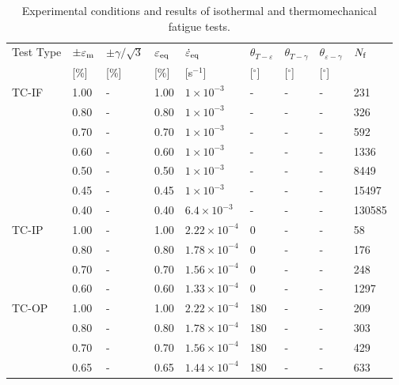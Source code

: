 \begin{table*}[htbp]
  \centering
  \caption{Experimental conditions and results of isothermal and thermomechanical fatigue tests.} \vspace{0.1cm}
    \begin{tabular}{p{2cm}p{1.2cm}p{1.2cm}p{1.2cm}p{2.5cm}p{1cm}p{1cm}p{1cm}p{1cm}}
    \hline
    Test Type & $\pm \varepsilon _{\rm m}$ & $\pm \gamma/ \sqrt 3$ & $\varepsilon _{\rm eq}$ & $\dot \varepsilon _{\rm eq}$ & $\theta_{T-\varepsilon}$ & $\theta_{T-\gamma}$ & $\theta_{\varepsilon-\gamma}$ & $N_{\rm f}$ \\
          & [\%]  & [\%]  & [\%]  & [s$^{-1}$] & [$^\circ$] & [$^\circ$] & [$^\circ$] &  \\
    \hline
    TC-IF & 1.00  & -     & 1.00  & $1\times 10^{-3}$ & -     & -     & -     & 231 \\
          & 0.80  & -     & 0.80  & $1\times 10^{-3}$ & -     & -     & -     & 326 \\
          & 0.70  & -     & 0.70  & $1\times 10^{-3}$ & -     & -     & -     & 592 \\
          & 0.60  & -     & 0.60  & $1\times 10^{-3}$ & -     & -     & -     & 1336 \\
          & 0.50  & -     & 0.50  & $1\times 10^{-3}$ & -     & -     & -     & 8449 \\
          & 0.45  & -     & 0.45  & $1\times 10^{-3}$ & -     & -     & -     & 15497 \\
          & 0.40  & -     & 0.40  & $6.4\times 10^{-3}$ & -     & -     & -     & 130585 \\
    \hline
    TC-IP & 1.00  & -     & 1.00  & $2.22\times 10^{-4}$ & 0     & -     & -     & 58 \\
          & 0.80  & -     & 0.80  & $1.78\times 10^{-4}$ & 0     & -     & -     & 176 \\
          & 0.70  & -     & 0.70  & $1.56\times 10^{-4}$ & 0     & -     & -     & 248 \\
          & 0.60  & -     & 0.60  & $1.33\times 10^{-4}$ & 0     & -     & -     & 1297 \\
    \hline
    TC-OP & 1.00  & -     & 1.00  & $2.22\times 10^{-4}$ & 180   & -     & -     & 209 \\
          & 0.80  & -     & 0.80  & $1.78\times 10^{-4}$ & 180   & -     & -     & 303 \\
          & 0.70  & -     & 0.70  & $1.56\times 10^{-4}$ & 180   & -     & -     & 429 \\
          & 0.65  & -     & 0.65  & $1.44\times 10^{-4}$ & 180   & -     & -     & 633 \\

\end{tabular}
\end{table*}
